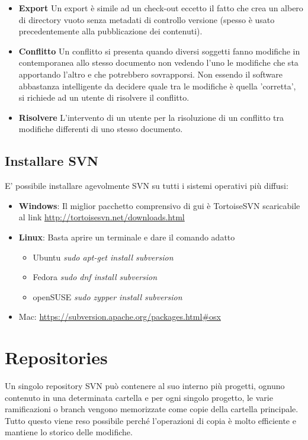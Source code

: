 \begin{itemize}
\item \textbf{Export}
Un export è simile ad un check-out eccetto il fatto che crea un albero di directory vuoto senza metadati di controllo versione (spesso è usato precedentemente alla pubblicazione dei contenuti).

\item \textbf{Conflitto}
Un conflitto si presenta quando diversi soggetti fanno modifiche in contemporanea allo stesso documento non vedendo l'uno le modifiche che sta apportando l'altro e che potrebbero sovrapporsi. Non essendo il software abbastanza intelligente da decidere quale tra le modifiche è quella 'corretta', si richiede ad un utente di risolvere il conflitto.

\item \textbf{Risolvere}
L'intervento di un utente per la risoluzione di un conflitto tra modifiche differenti di uno stesso documento.
\end{itemize}

\subsection{Installare SVN}
E' possibile installare agevolmente SVN su tutti i sistemi operativi più diffusi:

\begin{itemize}
\item \textbf{Windows}: Il miglior pacchetto comprensivo di gui è TortoiseSVN scaricabile al link \url{http://tortoisesvn.net/downloads.html}
\item \textbf{Linux}: Basta aprire un terminale e dare il comando adatto 
\begin{itemize}
\item Ubuntu \textit{sudo apt-get install subversion} 
\item Fedora \textit{sudo dnf install subversion} 
\item openSUSE \textit{sudo zypper install subversion} 
\end{itemize}
\item Mac: \url{https://subversion.apache.org/packages.html#osx}
\end{itemize}

\section{Repositories}

Un singolo repository SVN può contenere al suo interno più progetti, ognuno contenuto in una determinata cartella e per ogni singolo progetto, le varie ramificazioni o branch vengono memorizzate come copie della cartella principale.
Tutto questo viene reso possibile perché l'operazioni di copia è molto efficiente e mantiene lo storico delle modifiche.

